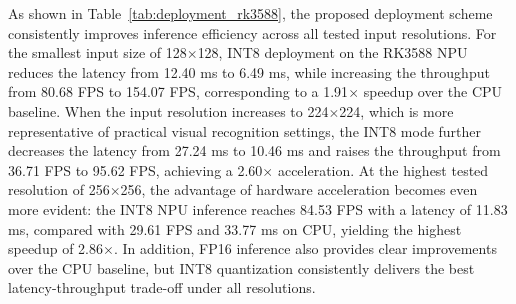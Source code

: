 \documentclass[review]{elsarticle}
\begin{document}
\begin{table}[t]
\centering
\caption{\small Deployment performance of S2M-KD on the RK3588 edge platform under different input resolutions. All NPU tests utilize the 3-core acceleration mode.}
\vspace{-1em}
\label{tab:deployment_rk3588}
\end{table}

As shown in Table~\ref{tab:deployment_rk3588}, the proposed deployment scheme consistently improves inference efficiency across all tested input resolutions. For the smallest input size of 128$\times$128, INT8 deployment on the RK3588 NPU reduces the latency from 12.40 ms to 6.49 ms, while increasing the throughput from 80.68 FPS to 154.07 FPS, corresponding to a 1.91$\times$ speedup over the CPU baseline. When the input resolution increases to 224$\times$224, which is more representative of practical visual recognition settings, the INT8 mode further decreases the latency from 27.24 ms to 10.46 ms and raises the throughput from 36.71 FPS to 95.62 FPS, achieving a 2.60$\times$ acceleration. At the highest tested resolution of 256$\times$256, the advantage of hardware acceleration becomes even more evident: the INT8 NPU inference reaches 84.53 FPS with a latency of 11.83 ms, compared with 29.61 FPS and 33.77 ms on CPU, yielding the highest speedup of 2.86$\times$. In addition, FP16 inference also provides clear improvements over the CPU baseline, but INT8 quantization consistently delivers the best latency-throughput trade-off under all resolutions.
\end{document}
